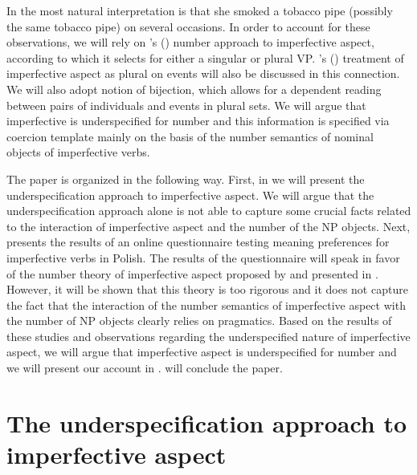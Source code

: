 \documentclass[output=paper]{langscibook}
\begin{document}
\noindent In  the most natural interpretation is that she smoked a tobacco pipe (possibly the same tobacco pipe) on several occasions. In order to account for these observations, we will rely on \citeauthor{Ferreira2004}'s (\citeyear{Ferreira2004, Ferreira2005}) number approach to imperfective aspect, according to which it selects for either a singular or plural VP. \citeauthor{Kagan2008}'s (\citeyear{Kagan2008, Kagan2010}) treatment of imperfective aspect as plural on events will also be discussed in this connection. We will also adopt  notion of bijection, which allows for a dependent reading between pairs of individuals and events in plural sets. We will argue that imperfective is underspecified for number and this information is specified via  coercion template mainly on the basis of the number semantics of nominal objects of imperfective verbs.

The paper is organized in the following way. First, in  we will present the underspecification approach to imperfective aspect. We will argue that the underspecification approach alone is not able to capture some crucial facts related to the interaction of imperfective aspect and the number of the NP objects. Next,  presents the results of an online questionnaire testing meaning preferences for imperfective verbs in Polish. The results of the questionnaire will speak in favor of the number theory of imperfective aspect proposed by \citet{Ferreira2004, Ferreira2005} and presented in . However, it will be shown that this theory is too rigorous and it does not capture the fact that the interaction of the number semantics of imperfective aspect with the number of NP objects clearly relies on pragmatics. Based on the results of these studies and observations regarding the underspecified nature of imperfective aspect, we will argue that imperfective aspect is underspecified for number and we will present our account in .  will conclude the paper.

\section{The underspecification approach to imperfective aspect}\label{jan-bla:fansb:kb:sec2}
\end{document}
